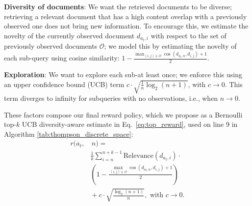 \noindent\textbf{Diversity of documents}: We want the retrieved documents to be diverse; retrieving a relevant document that has a high content overlap with a previously observed one does not bring new information. To encourage this, we estimate the novelty of the currently observed document \(d_{a_t, i}\) with respect to the set of previously observed documents \(\mathcal{O}\); we model this by estimating the novelty of each sub-query using cosine similarity: \(1 - \frac{\max_{(i, j) \in \mathcal{O}} \cos(d_{a_t, n}, d_{i, j}) + 1}{2}\).

\noindent\textbf{Exploration}: We want to explore each sub-at least once; we enforce this using an upper confidence bound (UCB) term \(c \cdot \sqrt{\frac{1}{n}\log_2(n + 1)}\), with \( c \to 0 \). This term diverges to infinity for subqueries with no observations, i.e., when \(n\rightarrow0\).


\noindent%
These factors compose our final reward policy, which we propose as a Bernoulli top-$k$ UCB diversity-aware estimate in Eq.~\ref{eq:top_reward}, used on line 9 in Algorithm \ref{tab:thompson_discrete_space}: 
%
\begin{equation}
\begin{split}
r(a_t, & \,n) = {}\\
& \frac{1}{k} \sum_{i=n}^{n+k-1} \text{Relevance}(d_{a_t, i}) \cdot {} \\
& \left( 1 -
    \frac{\max\limits_{(i, j) \in \mathcal{O}} \cos(d_{a_t, n}, d_{i, j}) + 1}{2} \right) \\
& {}+ c \cdot \sqrt{\frac{\log_2(n + 1)}{n}}, 
 \text{ with } c \to 0.
\end{split} 
\label{eq:top_reward}
\end{equation}

    

    

